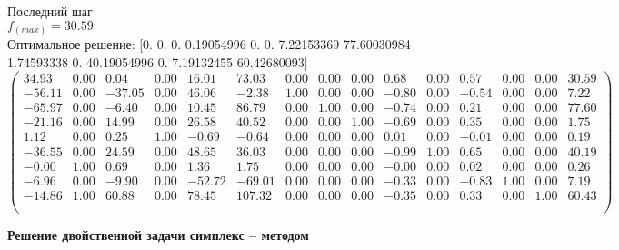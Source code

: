\documentclass[draft]{article}
\begin{document}
\begin{flushleft}
    Последний шаг\\
    $f_(max) = 30.59$\\
    Оптимальное решение:
    [0.  0.  0.  0.19054996  0.  0.  7.22153369  77.60030984  1.74593338  0.  40.19054996  0.  7.19132455  60.42680093]
\begin{equation*}
\begin{pmatrix}
  34.93 & 0.00 &   0.04 & 0.00 &  16.01 &  73.03 & 0.00 & 0.00 & 0.00 &  0.68 & 0.00 &  0.57 & 0.00 & 0.00 & 30.59 \\
 -56.11 & 0.00 & -37.05 & 0.00 &  46.06 &  -2.38 & 1.00 & 0.00 & 0.00 & -0.80 & 0.00 & -0.54 & 0.00 & 0.00 &  7.22 \\
 -65.97 & 0.00 &  -6.40 & 0.00 &  10.45 &  86.79 & 0.00 & 1.00 & 0.00 & -0.74 & 0.00 &  0.21 & 0.00 & 0.00 & 77.60 \\
 -21.16 & 0.00 &  14.99 & 0.00 &  26.58 &  40.52 & 0.00 & 0.00 & 1.00 & -0.69 & 0.00 &  0.35 & 0.00 & 0.00 &  1.75 \\
   1.12 & 0.00 &   0.25 & 1.00 &  -0.69 &  -0.64 & 0.00 & 0.00 & 0.00 &  0.01 & 0.00 & -0.01 & 0.00 & 0.00 &  0.19 \\
 -36.55 & 0.00 &  24.59 & 0.00 &  48.65 &  36.03 & 0.00 & 0.00 & 0.00 & -0.99 & 1.00 &  0.65 & 0.00 & 0.00 & 40.19 \\
  -0.00 & 1.00 &   0.69 & 0.00 &   1.36 &   1.75 & 0.00 & 0.00 & 0.00 & -0.00 & 0.00 &  0.02 & 0.00 & 0.00 &  0.26 \\
  -6.96 & 0.00 &  -9.90 & 0.00 & -52.72 & -69.01 & 0.00 & 0.00 & 0.00 & -0.33 & 0.00 & -0.83 & 1.00 & 0.00 &  7.19 \\
 -14.86 & 1.00 &  60.88 & 0.00 &  78.45 & 107.32 & 0.00 & 0.00 & 0.00 & -0.35 & 0.00 &  0.33 & 0.00 & 1.00 & 60.43 \\\\
\end{pmatrix}
\end{equation*}
\end{flushleft}

\textbf{ Решение двойственной задачи симплекс – методом}
\end{document}
